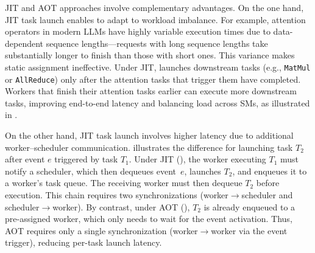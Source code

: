 JIT and AOT approaches involve complementary advantages. On the one hand, JIT task launch enables \sys to adapt to workload imbalance. For example, attention operators in modern LLMs have highly variable execution times due to data-dependent sequence lengths---requests with long sequence lengths take substantially longer to finish than those with short ones. This variance makes static assignment ineffective. Under JIT, \sys launches downstream tasks (e.g., {\tt MatMul} or {\tt AllReduce}) only after the attention tasks that trigger them have completed. Workers that finish their attention tasks earlier can execute more downstream tasks, improving end-to-end latency and balancing load across SMs, as illustrated in .

On the other hand, JIT task launch involves higher latency due to additional worker–scheduler communication.  illustrates the difference for launching task $T_2$ after event $e$ triggered by task $T_1$. Under JIT (), the worker executing $T_1$ must notify a scheduler, which then dequeues event~$e$, launches $T_2$, and enqueues it to a worker’s task queue. The receiving worker must then dequeue $T_2$ before execution. This chain requires two synchronizations (worker$\rightarrow$scheduler and scheduler$\rightarrow$worker). By contrast, under AOT (), $T_2$ is already enqueued to a pre-assigned worker, which only needs to wait for the event activation. Thus, AOT requires only a single synchronization (worker$\rightarrow$worker via the event trigger), reducing per-task launch latency.

